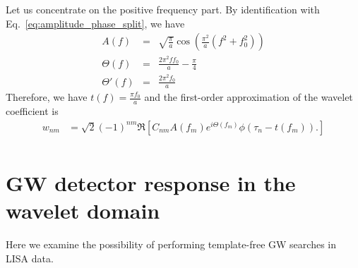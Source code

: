 \documentclass{article}
\begin{document}
Let us concentrate on the positive frequency part. By identification with Eq.~\eqref{eq:amplitude_phase_split}, we have
\begin{eqnarray}
    A(f) & = & \sqrt{\frac{\pi}{a}} \cos\left(\frac{\pi^2}{a} (f^2 + f_0^2)\right)  \nonumber \\
    \Theta(f) & = & \frac{2 \pi^2 f f_0}{a} - \frac{\pi}{4} \nonumber \\
    \Theta'(f) & = & \frac{2 \pi^2 f_0}{a}
\end{eqnarray}
Therefore, we have $t(f) = \frac{\pi f_0 }{a}$ and the first-order approximation of the wavelet coefficient is 
\begin{align}
\label{eq:chirp-first-order}
    w_{nm} & =\sqrt{2}(-1)^{nm}\Re\left[C_{nm} A(f_m)e^{i\Theta(f_m)} \phi\left(\tau_n - t(f_m) \right).\right] \nonumber \\
\end{align}

\section{GW detector response in the wavelet domain}

Here we examine the possibility of performing template-free GW searches in LISA data.
\end{document}
